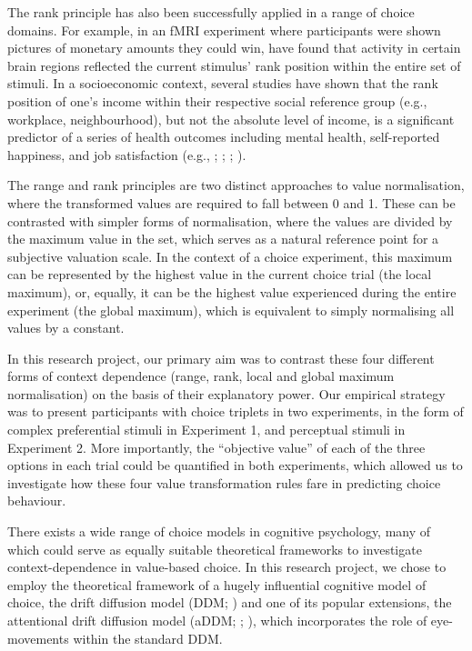 \documentclass[11pt,a4paper]{article}
\begin{document}
The rank principle has also been successfully applied in a range of choice domains. For example, in an fMRI experiment where participants were shown pictures of monetary amounts they could win,  have found that activity in certain brain regions reflected the current stimulus' rank position within the entire set of stimuli. In a socioeconomic context, several studies have shown that the rank position of one's income within their respective social reference group (e.g., workplace, neighbourhood), but not the absolute level of income, is a significant predictor of a series of health outcomes including mental health, self-reported happiness, and job satisfaction (e.g., ; ; ; ).

The range and rank principles are two distinct approaches to value normalisation, where the transformed values are required to fall between 0 and 1. These can be contrasted with simpler forms of normalisation, where the values are divided by the maximum value in the set, which serves as a natural reference point for a subjective valuation scale. In the context of a choice experiment, this maximum can be represented by the highest value in the current choice trial (the local maximum), or, equally, it can be the highest value experienced during the entire experiment (the global maximum), which is equivalent to simply normalising all values by a constant.

In this research project, our primary aim was to contrast these four different forms of context dependence (range, rank, local and global maximum normalisation) on the basis of their explanatory power. Our empirical strategy was to present participants with choice triplets in two experiments, in the form of complex preferential stimuli in Experiment 1, and perceptual stimuli in Experiment 2. More importantly, the ``objective value''  of each of the three options in each trial could be quantified in both experiments, which allowed us to investigate how these four value transformation rules fare in predicting choice behaviour.

There exists a wide range of choice models in cognitive psychology, many of which could serve as equally suitable theoretical frameworks to investigate context-dependence in value-based choice. In this research project, we chose to employ the theoretical framework of a hugely influential cognitive model of choice, the drift diffusion model (DDM; ) and one of its popular extensions, the attentional drift diffusion model (aDDM; ; ), which incorporates the role of eye-movements within the standard DDM. 
\end{document}

